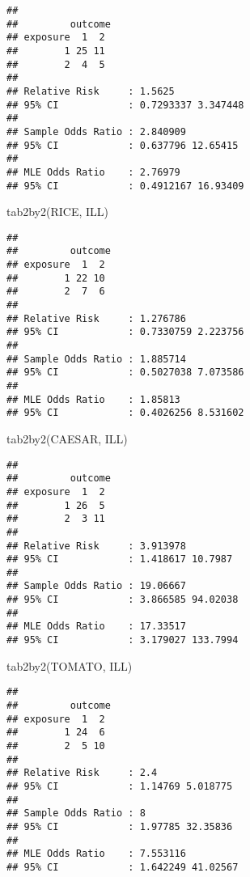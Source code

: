 \documentclass[
  12pt,
  a4paper]{book}
\newenvironment{Shaded}{\begin{snugshade}}{\end{snugshade}}
\newcommand{\FunctionTok}[1]{\textcolor[rgb]{0.00,0.00,0.00}{#1}}
\newcommand{\NormalTok}[1]{#1}
\begin{document}
\begin{verbatim}
## 
##         outcome
## exposure  1  2
##        1 25 11
##        2  4  5
## 
## Relative Risk     : 1.5625 
## 95% CI            : 0.7293337 3.347448 
## 
## Sample Odds Ratio : 2.840909 
## 95% CI            : 0.637796 12.65415 
## 
## MLE Odds Ratio    : 2.76979 
## 95% CI            : 0.4912167 16.93409
\end{verbatim}

\newpage

\begin{Shaded}
\begin{Highlighting}[]
\FunctionTok{tab2by2}\NormalTok{(RICE, ILL)}
\end{Highlighting}
\end{Shaded}

\begin{verbatim}
## 
##         outcome
## exposure  1  2
##        1 22 10
##        2  7  6
## 
## Relative Risk     : 1.276786 
## 95% CI            : 0.7330759 2.223756 
## 
## Sample Odds Ratio : 1.885714 
## 95% CI            : 0.5027038 7.073586 
## 
## MLE Odds Ratio    : 1.85813 
## 95% CI            : 0.4026256 8.531602
\end{verbatim}

\begin{Shaded}
\begin{Highlighting}[]
\FunctionTok{tab2by2}\NormalTok{(CAESAR, ILL)}
\end{Highlighting}
\end{Shaded}

\begin{verbatim}
## 
##         outcome
## exposure  1  2
##        1 26  5
##        2  3 11
## 
## Relative Risk     : 3.913978 
## 95% CI            : 1.418617 10.7987 
## 
## Sample Odds Ratio : 19.06667 
## 95% CI            : 3.866585 94.02038 
## 
## MLE Odds Ratio    : 17.33517 
## 95% CI            : 3.179027 133.7994
\end{verbatim}

\newpage

\begin{Shaded}
\begin{Highlighting}[]
\FunctionTok{tab2by2}\NormalTok{(TOMATO, ILL)}
\end{Highlighting}
\end{Shaded}

\begin{verbatim}
## 
##         outcome
## exposure  1  2
##        1 24  6
##        2  5 10
## 
## Relative Risk     : 2.4 
## 95% CI            : 1.14769 5.018775 
## 
## Sample Odds Ratio : 8 
## 95% CI            : 1.97785 32.35836 
## 
## MLE Odds Ratio    : 7.553116 
## 95% CI            : 1.642249 41.02567
\end{verbatim}
\end{document}

